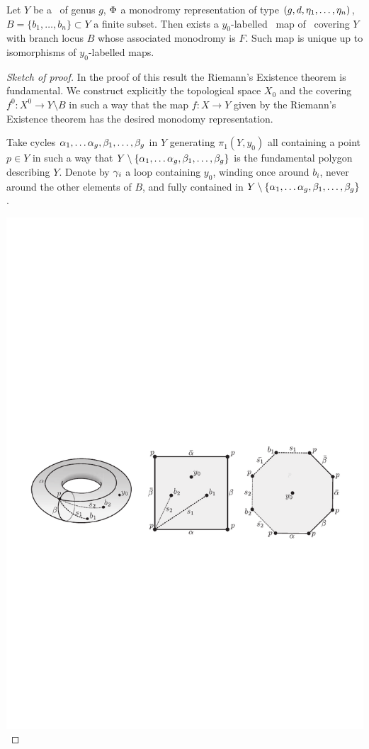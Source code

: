 \documentclass[../main/main.tex]{subfiles}
\begin{document}
\begin{theorem}[{\cite[Thm. 7.2.2]{CM}}]
	Let $Y$ be a \rs\ of genus $g$, $\Phi$ a monodromy representation of type $(g,d,\eta_1,\ldots,\eta_n)$, $B=\{b_1,\ldots,b_n\}\subset Y$ a finite subset. Then exists a $y_0$-labelled \holo\ map of \rs\ covering $Y$ with branch locus $B$ whose associated monodromy is $F$. Such map is unique up to isomorphisms of $y_0$-labelled maps. 
\end{theorem}
\begin{proof}[Sketch of proof]
	In the proof of this result the Riemann's Existence theorem is fundamental. We construct explicitly the topological space $X_0$ and the covering $f^0\colon X^0\to Y\setminus B$ in such a way that the map $f\colon X\to Y$ given by the Riemann's Existence theorem has the desired monodomy representation. 
	
	Take cycles $\alpha_1,\ldots\alpha_g,\beta_1,\ldots,\beta_g$ in $Y$ generating $\pi_1(Y,y_0)$ all containing a point $p\in Y$ in such a way that $Y\setminus\{\alpha_1,\ldots\alpha_g,\beta_1,\ldots,\beta_g\}$ is the fundamental polygon describing $Y$. Denote by $\gamma_i$ a loop containing $y_0$, winding once around $b_i$, never around the other elements of $B$, and fully contained in $Y\setminus\{\alpha_1,\ldots\alpha_g,\beta_1,\ldots,\beta_g\}$.
	
	

	\includegraphics[]{../figures/CM-fig-7-6.pdf}
	

\end{proof}
\end{document}
